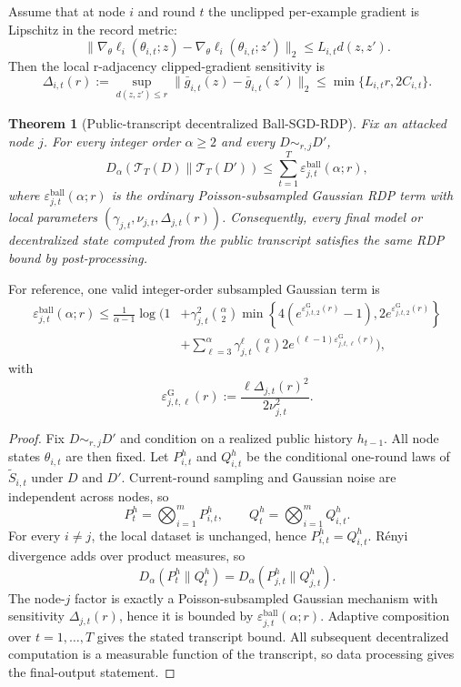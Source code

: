 \documentclass[conference,compsoc]{IEEEtran}
\newtheorem{theorem}{Theorem}
\newcommand{\cT}{\mathcal{T}}
\newcommand{\eps}{\varepsilon}
\begin{document}
Assume that at node $i$ and round $t$ the unclipped per-example gradient is Lipschitz in the record metric:
\[
\|\nabla_\theta\ell_i(\theta_{i,t};z)-\nabla_\theta\ell_i(\theta_{i,t};z')\|_2
\le L_{i,t}d(z,z').
\]
Then the local r-adjacency clipped-gradient sensitivity is
\[
\Delta_{i,t}(r)
:=
\sup_{d(z,z')\le r}
\|\bar g_{i,t}(z)-\bar g_{i,t}(z')\|_2
\le
\min\{L_{i,t}r,2C_{i,t}\}.
\]

\begin{theorem}[Public-transcript decentralized Ball-SGD-RDP]
\label{thm:public-transcript}
Fix an attacked node $j$. For every integer order $\alpha\ge2$ and every $D\sim_{r,j}D'$,
\[
D_\alpha(\cT_T(D)\|\cT_T(D'))
\le
\sum_{t=1}^T\eps_{j,t}^{\mathrm{ball}}(\alpha;r),
\]
where $\eps_{j,t}^{\mathrm{ball}}(\alpha;r)$ is the ordinary Poisson-subsampled Gaussian RDP term with local parameters $(\gamma_{j,t},\nu_{j,t},\Delta_{j,t}(r))$.
Consequently, every final model or decentralized state computed from the public transcript satisfies the same RDP bound by post-processing.
\end{theorem}

For reference, one valid integer-order subsampled Gaussian term is
\[
\begin{aligned}
\eps_{j,t}^{\mathrm{ball}}(\alpha;r)
\le
\frac1{\alpha-1}\log\Bigg(
1
&+
\gamma_{j,t}^2\binom{\alpha}{2}
\min\left\{
4(e^{\eps_{j,t,2}^{\mathrm G}(r)}-1),
2e^{\eps_{j,t,2}^{\mathrm G}(r)}
\right\}\\
&+
\sum_{\ell=3}^{\alpha}
\gamma_{j,t}^{\ell}\binom{\alpha}{\ell}
2e^{(\ell-1)\eps_{j,t,\ell}^{\mathrm G}(r)}
\Bigg),
\end{aligned}
\]
with
\[
\eps_{j,t,\ell}^{\mathrm G}(r):=\frac{\ell\Delta_{j,t}(r)^2}{2\nu_{j,t}^2}.
\]

\begin{proof}
Fix $D\sim_{r,j}D'$ and condition on a realized public history $h_{t-1}$. All node states $\theta_{i,t}$ are then fixed. Let $P_{i,t}^h$ and $Q_{i,t}^h$ be the conditional one-round laws of $\widetilde S_{i,t}$ under $D$ and $D'$. Current-round sampling and Gaussian noise are independent across nodes, so
\[
P_t^h=\bigotimes_{i=1}^m P_{i,t}^h,
\qquad
Q_t^h=\bigotimes_{i=1}^m Q_{i,t}^h.
\]
For every $i\ne j$, the local dataset is unchanged, hence $P_{i,t}^h=Q_{i,t}^h$. R\'enyi divergence adds over product measures, so
\[
D_\alpha(P_t^h\|Q_t^h)
=D_\alpha(P_{j,t}^h\|Q_{j,t}^h).
\]
The node-$j$ factor is exactly a Poisson-subsampled Gaussian mechanism with sensitivity $\Delta_{j,t}(r)$, hence it is bounded by $\eps_{j,t}^{\mathrm{ball}}(\alpha;r)$. Adaptive composition over $t=1,\ldots,T$ gives the stated transcript bound. All subsequent decentralized computation is a measurable function of the transcript, so data processing gives the final-output statement.
\end{proof}
\end{document}
